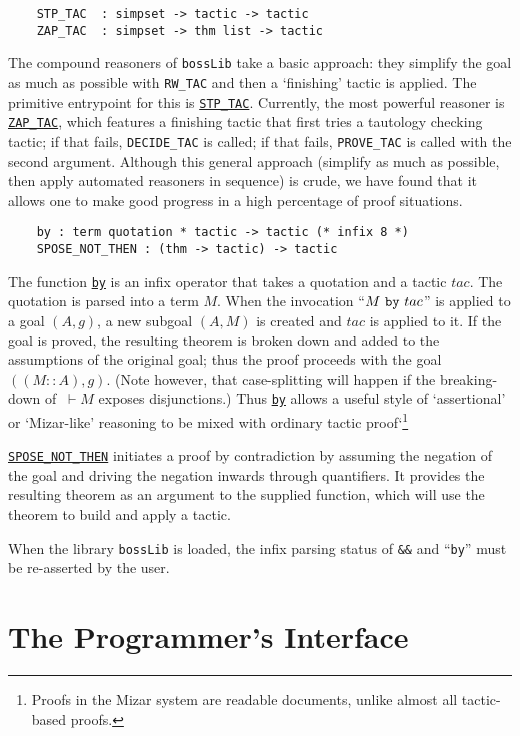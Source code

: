 \documentclass[12pt,fleqn,a4paper]{report}
\begin{document}
\begin{verbatim}
    STP_TAC  : simpset -> tactic -> tactic
    ZAP_TAC  : simpset -> thm list -> tactic
\end{verbatim}

The compound reasoners of \verb+bossLib+ take a basic approach: they
simplify the goal as much as possible with \verb+RW_TAC+ and then a
`finishing' tactic is applied. The primitive entrypoint for this is
\underline{\tt STP\_TAC}. Currently, the most powerful reasoner is
\underline{\tt ZAP\_TAC}, which features a finishing tactic that first
tries a tautology checking tactic; if that fails, \verb+DECIDE_TAC+ is
called; if that fails, \verb+PROVE_TAC+ is called with the second
argument. Although this general approach (simplify as much as possible,
then apply automated reasoners in sequence) is crude, we have found that
it allows one to make good progress in a high percentage of proof
situations.

\begin{verbatim}
    by : term quotation * tactic -> tactic (* infix 8 *)
    SPOSE_NOT_THEN : (thm -> tactic) -> tactic
\end{verbatim}

The function \underline{\tt by} is an infix operator that takes a
quotation and a tactic $tac$. The quotation is parsed into a term
$M$. When the invocation ``$M\ \mbox{\tt by}\ tac$'' is applied to a
goal $(A,g)$, a new subgoal $(A,M)$ is created and $tac$ is applied to
it. If the goal is proved, the resulting theorem is broken down and
added to the assumptions of the original goal; thus the proof proceeds
with the goal $((M::A), g)$. (Note however, that case-splitting will
happen if the breaking-down of $\ \vdash M$ exposes disjunctions.) Thus
\underline{\tt by} allows a useful style  of `assertional' or
`Mizar-like' reasoning to be mixed with ordinary tactic
proof`\footnote{Proofs in the Mizar system are readable documents,
unlike almost all tactic-based proofs.}


\underline{\tt SPOSE\_NOT\_THEN} initiates a proof by
contradiction by assuming the negation of the goal and driving the
negation inwards through quantifiers. It provides the resulting theorem
as an argument to the supplied function, which will use the theorem to
build and apply a tactic.

 When the library \verb+bossLib+ is loaded, the
infix parsing status of \verb+&&+ and ``{\tt by}'' must be re-asserted
by the user.




\chapter{The Programmer's Interface}\label{api}



\end{document}
